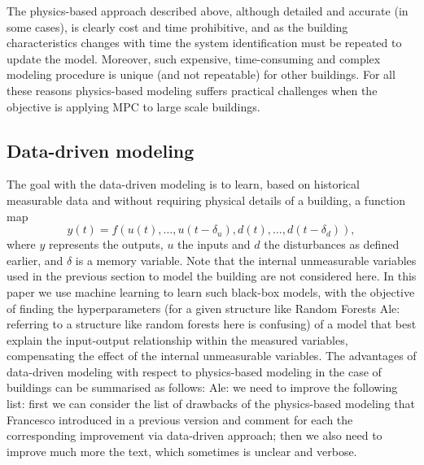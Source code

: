 {The physics-based approach described above, although detailed and accurate (in some cases), is clearly cost and time prohibitive, and as the building characteristics changes with time the system identification must be repeated to update the model. Moreover, such expensive, time-consuming and complex modeling procedure is unique (and not repeatable) for other buildings. For all these reasons physics-based modeling suffers practical challenges when the objective is applying MPC to large scale buildings.
} 






\subsection{Data-driven modeling}

\textcolor[rgb]{0,0,1}{The goal with the data-driven modeling is to learn, based on historical measurable data and without requiring physical details of a building, a function map
\begin{equation}\label{E:MLexample}
	y(t) = f(u(t),\dots,u(t-\delta_u), d(t),\dots, d(t-\delta_d)),
\end{equation}
where \(y\) represents the outputs, \(u\) the inputs and \(d\) the disturbances as defined earlier, and \(\delta\) is a memory variable. Note that the internal unmeasurable variables used in the previous section to model the building are not considered here. In this paper we use machine learning to learn such black-box models, with the objective of finding the hyperparameters (for a given structure like Random Forests \textcolor[rgb]{1,0,0}{Ale: referring to a structure like random forests here is confusing}) of a model that best explain the input-output relationship within the measured variables, compensating the effect of the internal unmeasurable variables. The advantages of data-driven modeling with respect to physics-based modeling in the case of buildings can be summarised as follows:}
\textcolor[rgb]{1,0,0}{Ale: we need to improve the following list: first we can consider the list of drawbacks of the physics-based modeling that Francesco introduced in a previous version and comment for each the corresponding improvement via data-driven approach; then we also need to improve much more the text, which sometimes is unclear and verbose.}

